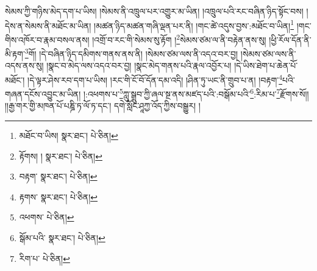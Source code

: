 སེམས་ཀྱི་གཉིས་མེད་དག་པ་ཡིས། །སེམས་ནི་འཁྲུལ་པར་འགྱུར་མ་ཡིན། །འཁྲུལ་པའི་རང་བཞིན་ཉིད་སྟོང་བས། །དེས་ན་སེམས་ནི་མཐོང་མ་ཡིན། །མཚན་ཉིད་མཚན་གཞི་ལྡན་པར་ནི། །གང་ཚེ་འདུས་བྱས་:མཐོང་བ་ཡིན།\footnote{མཐོང་བ་ཡིས།  སྣར་ཐང་།  པེ་ཅིན། } །གང་གིས་འཁོར་བ་རྣམ་བསལ་ནས། །འགྲོ་བ་རང་གི་སེམས་སུ་རྟོག །\footnote{རྟོགས། །  སྣར་ཐང་།  པེ་ཅིན། }སེམས་ཙམ་ལ་ནི་བརྟེན་ནས་སུ། །ཕྱི་རོལ་དོན་ནི་མི་རྟག་\footnote{བརྟག་  སྣར་ཐང་།  པེ་ཅིན། }གོ། །དེ་བཞིན་ཉིད་དམིགས་གནས་ནས་ནི། །སེམས་ཙམ་ལས་ནི་འདའ་བར་བྱ། །སེམས་ཙམ་ལས་ནི་འདས་ནས་སུ། །སྣང་བ་མེད་ལས་འདའ་བར་བྱ། །སྣང་མེད་གནས་པའི་རྣལ་འབྱོར་པ། །དེ་ཡིས་ཐེག་པ་ཆེན་པོ་མཐོང་། །དེ་ལྟར་ཤེས་རབ་དག་པ་ཡིས། །རང་གི་ངོ་བོ་དོན་དམ་འདི། །ཤིན་ཏུ་ཡང་ནི་གྲུབ་པ་ན། །བརྟག་\footnote{རྟགས་  སྣར་ཐང་།  པེ་ཅིན། }པའི་གཞན་དངོས་འབྱུང་མ་ཡིན། །:འཕགས་པ་\footnote{འཕགས་  པེ་ཅིན། }ཀླུ་སྒྲུབ་ཀྱི་ཞལ་སྔ་ནས་མཛད་པའི་:བསྒོམ་པའི་\footnote{སྒོམ་པའི་  སྣར་ཐང་།  པེ་ཅིན། }:རིམ་པ་\footnote{རིག་པ་  པེ་ཅིན། }རྫོགས་སོ།། །།རྒྱ་གར་གྱི་མཁན་པོ་པཎྜི་ཏ་ལོ་ཏ་དང་། དགེ་སློང་ཤཱཀྱ་འོད་ཀྱིས་བསྒྱུར། ། 